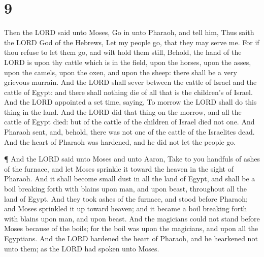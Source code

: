 \hypertarget{section-8}{%
\section{9}\label{section-8}}

 Then the LORD said unto Moses, Go in unto Pharaoh, and tell
him, Thus saith the LORD God of the Hebrews, Let my people go, that they
may serve me.  For if thou refuse to let them go, and wilt
hold them still,  Behold, the hand of the LORD is upon thy
cattle which is in the field, upon the horses, upon the asses, upon the
camels, upon the oxen, and upon the sheep: there shall be a very
grievous murrain.  And the LORD shall sever between the
cattle of Israel and the cattle of Egypt: and there shall nothing die of
all that is the children's of Israel.  And the LORD
appointed a set time, saying, To morrow the LORD shall do this thing in
the land.  And the LORD did that thing on the morrow, and
all the cattle of Egypt died: but of the cattle of the children of
Israel died not one.  And Pharaoh sent, and, behold, there
was not one of the cattle of the Israelites dead. And the heart of
Pharaoh was hardened, and he did not let the people go.

 ¶ And the LORD said unto Moses and unto Aaron, Take to you
handfuls of ashes of the furnace, and let Moses sprinkle it toward the
heaven in the sight of Pharaoh.  And it shall become small
dust in all the land of Egypt, and shall be a boil breaking forth with
blains upon man, and upon beast, throughout all the land of Egypt.
 And they took ashes of the furnace, and stood before
Pharaoh; and Moses sprinkled it up toward heaven; and it became a boil
breaking forth with blains upon man, and upon beast.  And
the magicians could not stand before Moses because of the boils; for the
boil was upon the magicians, and upon all the Egyptians. 
And the LORD hardened the heart of Pharaoh, and he hearkened not unto
them; as the LORD had spoken unto Moses.

